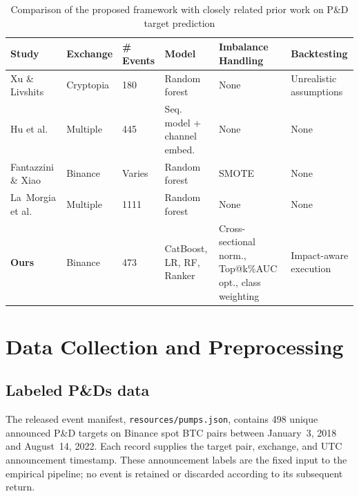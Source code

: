 \documentclass{ieeeaccess}
\begin{document}
\begin{table}[!t]
    \centering
    \small
    \renewcommand{\arraystretch}{1.3}
    \setlength{\tabcolsep}{5pt}
    \caption{Comparison of the proposed framework with closely related prior work on P\&D target prediction}
    \begin{tabular}{p{2.8cm}p{2.2cm}p{2cm}p{2.2cm}p{2.5cm}p{2.5cm}}
        \toprule
        \textbf{Study} & \textbf{Exchange} & \textbf{\# Events} & \textbf{Model} & \textbf{Imbalance Handling} & \textbf{Backtesting} \\
        \midrule
        Xu \& Livshits~\cite{pd_anatomy} & Cryptopia & 180 & Random forest & None & Unrealistic assumptions \\
        Hu et al.~\cite{hu2023sequence} & Multiple & 445 & Seq. model + channel embed. & None & None \\
        Fantazzini \& Xiao~\cite{econometrics11030022} & Binance & Varies & Random forest & SMOTE & None \\
        La~Morgia et al.~\cite{la_morgia_pump_2020} & Multiple & 1111 & Random forest & None & None \\
        \textbf{Ours} & Binance & 473 & CatBoost, LR, RF, Ranker & Cross-sectional norm., Top@k\%AUC opt., class weighting & Impact-aware execution \\
        \bottomrule
    \end{tabular}
    \label{table:comparison_prior_work}
\end{table}

\section{Data Collection and Preprocessing}

\subsection{Labeled P\&Ds data}
\label{section:pump_and_dump_data}

The released event manifest, \texttt{resources/pumps.json}, contains 498 unique announced P\&D targets on Binance spot BTC pairs between January~3, 2018 and August~14, 2022. Each record supplies the target pair, exchange, and UTC announcement timestamp. These announcement labels are the fixed input to the empirical pipeline; no event is retained or discarded according to its subsequent return.
\end{document}
